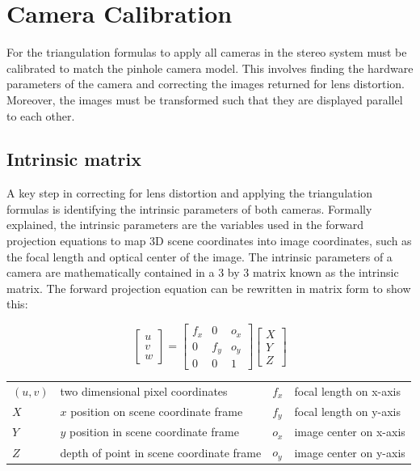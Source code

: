 \documentclass[11pt]{scrartcl}
\begin{document}
\section{Camera Calibration}

For the triangulation formulas to apply all cameras in the stereo 
system must be calibrated to match the pinhole camera model. This involves finding the hardware parameters of the camera and correcting the images returned for lens distortion. Moreover, the images must be transformed such that they are displayed parallel to each other. 

\subsection{Intrinsic matrix}

A key step in correcting for lens distortion and applying the triangulation formulas is identifying the intrinsic parameters of both cameras. Formally explained, the intrinsic parameters are the variables used in the forward projection equations to map 3D scene coordinates into image coordinates, such as the focal length and optical center of the image. The intrinsic parameters of a camera are mathematically contained in 
a 3 by 3 matrix known as the intrinsic matrix. The forward projection equation can be rewritten in matrix form to show this:
 
\begin{theorem}
     \begin{displaymath}
    \begin{bmatrix}
      u \\
      v \\
      w    \end{bmatrix} =
    \begin{bmatrix}
      f_x & 0 & o_x \\
      0 & f_y & o_y \\
      0 & 0 & 1
    \end{bmatrix}
    \begin{bmatrix}
      X \\
      Y \\
      Z
    \end{bmatrix} 
  \end{displaymath}
  \begin{figurekey}
    \begin{tabular}{llll}
      $(u,v)$ & two dimensional pixel coordinates        & $f_x$ & focal length on x-axis \\
      $X$   & $x$ position on scene coordinate frame   & $f_y$ & focal length on y-axis \\
      $Y$   & $y$ position in scene coordinate frame   & $o_x$ & image center on x-axis \\
      $Z$   & depth of point in scene coordinate frame & $o_y$ & image center on y-axis \\
    \end{tabular}
  \end{figurekey}

\end{theorem}
\end{document}
